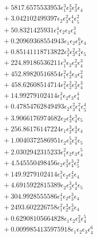 \documentclass[10pt]{article}
\begin{document}
\begin{align*}
&{}  + 5817.6575533953 \epsilon_{1}^{3} \epsilon_{2}^{3} \epsilon_{3}^{2} \epsilon_{4} \\
&{}  + 3.042102499397 \epsilon_{2} \epsilon_{3}^{2} \epsilon_{4}^{4} \epsilon_{5}^{2} \\
&{}  + 50.8321425931 \epsilon_{1}^{4} \epsilon_{2} \epsilon_{3} \epsilon_{4}^{3} \\
&{}  + 0.20969368554943 \epsilon_{1} \epsilon_{2} \epsilon_{3}^{6} \epsilon_{4} \\
&{}  + 0.85141118713822 \epsilon_{2}^{3} \epsilon_{3}^{2} \epsilon_{4}^{3} \epsilon_{5} \\
&{}  + 224.89186536211 \epsilon_{1}^{3} \epsilon_{2} \epsilon_{3}^{2} \epsilon_{4}^{3} \\
&{}  + 452.89820516854 \epsilon_{1}^{2} \epsilon_{2}^{4} \epsilon_{3} \epsilon_{4}^{2} \\
&{}  + 458.62608514714 \epsilon_{1}^{2} \epsilon_{2}^{2} \epsilon_{3}^{2} \epsilon_{4}^{3} \\
&{}  + 14.99279102414 \epsilon_{1}^{3} \epsilon_{2} \epsilon_{3} \epsilon_{4}^{4} \\
&{}  + 0.47854762849493 \epsilon_{2} \epsilon_{3}^{2} \epsilon_{4}^{2} \epsilon_{5}^{4} \\
&{}  + 3.9066176974682 \epsilon_{2} \epsilon_{3}^{4} \epsilon_{4}^{3} \epsilon_{5} \\
&{}  + 256.86176147224 \epsilon_{1} \epsilon_{2}^{3} \epsilon_{3}^{4} \epsilon_{4} \\
&{}  + 1.0040372586951 \epsilon_{2} \epsilon_{3}^{5} \epsilon_{4}^{2} \epsilon_{5} \\
&{}  + 2.0302942315233 \epsilon_{1}^{2} \epsilon_{2} \epsilon_{3} \epsilon_{4}^{5} \\
&{}  + 4.545550498456 \epsilon_{2} \epsilon_{3}^{3} \epsilon_{4}^{3} \epsilon_{5}^{2} \\
&{}  + 149.9279102414 \epsilon_{1}^{3} \epsilon_{2} \epsilon_{3}^{4} \epsilon_{4} \\
&{}  + 4.6915922815389 \epsilon_{2} \epsilon_{3}^{3} \epsilon_{4}^{4} \epsilon_{5} \\
&{}  + 304.9928555586 \epsilon_{1}^{4} \epsilon_{2} \epsilon_{3}^{3} \epsilon_{4} \\
&{}  + 2493.602226758 \epsilon_{1}^{2} \epsilon_{2}^{3} \epsilon_{3}^{3} \epsilon_{4} \\
&{}  + 0.62908105664828 \epsilon_{1} \epsilon_{2} \epsilon_{3}^{2} \epsilon_{4}^{5} \\
&{}  + 0.0099854135975918 \epsilon_{1} \epsilon_{2} \epsilon_{3} \epsilon_{4}^{6} \\

\end{align*}
\end{document}
